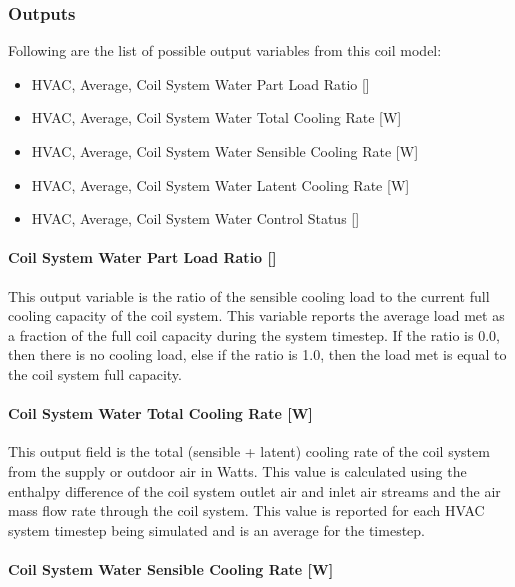 \subsubsection{Outputs}\label{outputs}

Following are the list of possible output variables from this coil model:

\begin{itemize}
\item HVAC, Average, Coil System Water Part Load Ratio {[]}
\item HVAC, Average, Coil System Water Total Cooling Rate {[}W{]}
\item HVAC, Average, Coil System Water Sensible Cooling Rate {[}W{]}
\item HVAC, Average, Coil System Water Latent Cooling Rate {[}W{]}
\item HVAC, Average, Coil System Water Control Status {[]}
\end{itemize}


\paragraph{Coil System Water Part Load Ratio {[]}}\label{coil-system-water-part-load-ratio}

This output variable is the ratio of the sensible cooling load to the current full cooling capacity of the coil system. This variable reports the average load met as a fraction of the full coil capacity during the system timestep. If the ratio is 0.0, then there is no cooling load, else if the ratio is 1.0, then the load met is equal to the coil system full capacity.

\paragraph{Coil System Water Total Cooling Rate {[}W{]}}\label{coil-system-water-total-cooling-rate}

This output field is the total (sensible + latent) cooling rate of the coil system from the supply or outdoor air in Watts. This value is calculated using the enthalpy difference of the coil system outlet air and inlet air streams and the air mass flow rate through the coil system. This value is reported for each HVAC system timestep being simulated and is an average for the timestep.

\paragraph{Coil System Water Sensible Cooling Rate {[}W{]}}\label{coil-system-water-sensible-cooling-rate}

